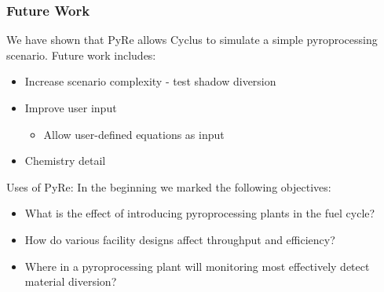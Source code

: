 \begin{frame}
  \frametitle{Future Work}
  We have shown that PyRe allows Cyclus to simulate a simple pyroprocessing scenario. Future work includes:
  \begin{itemize}
     \item Increase scenario complexity - test shadow diversion
     \item Improve user input
     \begin{itemize}
      	\item Allow user-defined equations as input
     \end{itemize}
     \item Chemistry detail
  \end{itemize}
\begin{block}{Uses of PyRe:}
	In the beginning we marked the following objectives:
\begin{itemize}
	\item What is the effect of introducing pyroprocessing plants in the fuel cycle?
	\item How do various facility designs affect throughput and efficiency?
	\item Where in a pyroprocessing plant will monitoring most 
	effectively detect material diversion?
\end{itemize}
\end{block}
\end{frame}

